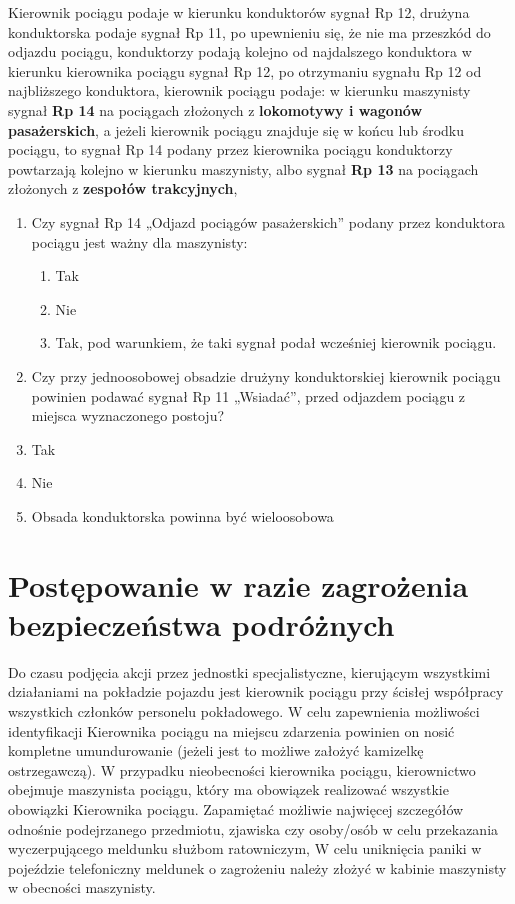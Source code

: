Kierownik pociągu podaje w kierunku konduktorów sygnał Rp 12, drużyna konduktorska podaje sygnał Rp 11, po upewnieniu się, że nie ma przeszkód do odjazdu pociągu, konduktorzy podają kolejno od najdalszego konduktora w kierunku kierownika pociągu sygnał Rp 12, po otrzymaniu sygnału Rp 12 od najbliższego konduktora, kierownik pociągu podaje: w kierunku maszynisty sygnał \textbf{Rp 14} na pociągach złożonych z \textbf{lokomotywy i wagonów pasażerskich}, a jeżeli kierownik pociągu znajduje się w końcu lub środku pociągu, to sygnał Rp 14 podany przez kierownika pociągu konduktorzy powtarzają kolejno w kierunku maszynisty, albo sygnał \textbf{Rp 13} na pociągach złożonych z \textbf{zespołów trakcyjnych},
\begin{tcolorbox}
	\begin{enumerate}
		\item Czy sygnał Rp 14 „Odjazd pociągów pasażerskich” podany przez konduktora pociągu jest ważny dla maszynisty:
		\begin{enumerate}
			\item Tak
			\item Nie
			\item Tak, pod warunkiem, że taki sygnał podał wcześniej kierownik pociągu.
		\end{enumerate}
		\item Czy przy jednoosobowej obsadzie drużyny konduktorskiej kierownik pociągu powinien podawać sygnał Rp 11 „Wsiadać”, przed odjazdem pociągu z miejsca wyznaczonego postoju?
		\item Tak
		\item Nie
		\item Obsada konduktorska powinna być wieloosobowa
	\end{enumerate}
\end{tcolorbox}

\chapter{Postępowanie w razie zagrożenia bezpieczeństwa podróżnych}
Do czasu podjęcia akcji przez jednostki specjalistyczne, kierującym wszystkimi działaniami na pokładzie pojazdu jest kierownik pociągu przy ścisłej współpracy wszystkich członków personelu pokładowego. 
W celu zapewnienia możliwości identyfikacji Kierownika pociągu na miejscu zdarzenia powinien on nosić kompletne umundurowanie (jeżeli jest to możliwe założyć kamizelkę ostrzegawczą). 
W przypadku nieobecności kierownika pociągu, kierownictwo obejmuje maszynista pociągu, który ma obowiązek realizować wszystkie obowiązki Kierownika pociągu.
Zapamiętać możliwie najwięcej szczegółów odnośnie podejrzanego przedmiotu, zjawiska czy osoby/osób w celu przekazania wyczerpującego meldunku służbom ratowniczym,
W celu uniknięcia paniki w pojeździe telefoniczny meldunek o zagrożeniu należy złożyć w kabinie maszynisty w obecności maszynisty.

